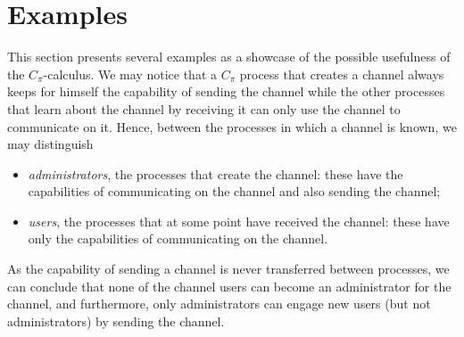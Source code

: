 \section{Examples}\label{sec:examples}


This section presents several examples as a showcase of the possible usefulness of the $C_\pi$-calculus. 
We may notice that a $C_\pi$ process that creates a channel always keeps for himself the capability of sending the channel while the other processes that learn about the channel by receiving it can only use the channel to communicate on it. Hence, between the processes in which a channel is known, we may distinguish 

\begin{itemize}
\item \emph{administrators}, the processes that create the channel: these have the capabilities of communicating on the channel and also sending the channel;
\item \emph{users}, the processes that at some point have received the channel: these have only the capabilities of communicating on the channel.
\end{itemize}

As the capability of sending a channel is never transferred between processes, we can conclude that none of the channel users can become an administrator for the channel, and furthermore, only administrators can engage new users (but not administrators) by sending the channel.  

